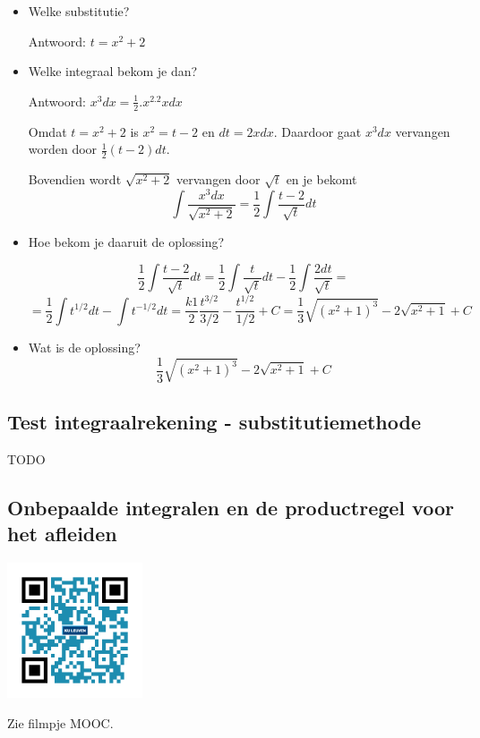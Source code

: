 \begin{enumerate}
	\begin{itemize}
		\item Welke substitutie?
		
		Antwoord: $t=x^2+2$
		
		\item Welke integraal bekom je dan?
		
		Antwoord: $x^3dx=\frac{1}{2}.x^2.2xdx$
		
		Omdat $t=x^2+2$ is $x^2=t-2$ en $dt=2xdx$.
		Daardoor gaat $x^3dx$ vervangen worden door $\frac{1}{2}(t-2)dt$.
		
		Bovendien wordt $\sqrt{x^2+2}$ vervangen door $\sqrt{t}$ en je bekomt
		\[
		\int \frac{x^3dx}{\sqrt{x^2+2}}=\frac{1}{2} \int \frac{t-2}{\sqrt{t}}dt
		\]
		
		\item Hoe bekom je daaruit de oplossing?
		
		\[
		\frac{1}{2} \int \frac{t-2}{\sqrt{t}}dt=\frac{1}{2} \int \frac{t}{\sqrt{t}}dt - \frac{1}{2}\int \frac{2dt}{\sqrt{t}}=
		\]
		\[
		=\frac{1}{2} \int t^{1/2}dt - \int t^{-1/2}dt=\frac{k1}{2}\frac{t^{3/2}}{3/2}-\frac{t^{1/2}}{1/2}+C=\frac{1}{3} \sqrt{(x^2+1)^3}-2\sqrt{x^2+1}+C
		\]
		
		\item Wat is de oplossing?
		\[
		\frac{1}{3} \sqrt{(x^2+1)^3}-2\sqrt{x^2+1}+C
		\]
		
	\end{itemize}
	
\end{enumerate}


\subsection{Test integraalrekening - substitutiemethode}
TODO

\subsection{Onbepaalde integralen en de productregel voor het afleiden}
\begin{minipage}{.25\linewidth}
	\raggedright
	\includegraphics[width=4cm]{6_afgeleiden_integralen/inputs/QR_Code_ONBEPPRODUCTREGEL_module6_3}
\end{minipage}
\begin{minipage}{.7\linewidth}
	Zie filmpje MOOC.
\end{minipage}


